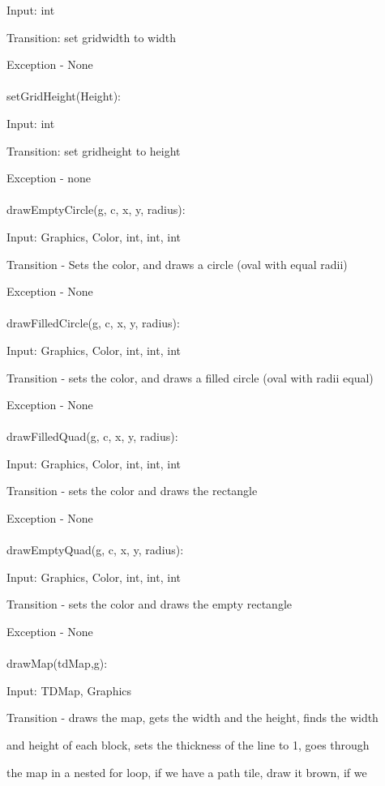 \documentclass[12,english]{article}
\begin{document}
		Input: int
		
		Transition: set gridwidth to width
		
		
		Exception - None\\
		\\
		setGridHeight(Height):
		
			Input: int
			
			Transition: set gridheight to height
			 
			Exception - none\\
			\\
		drawEmptyCircle(g, c, x, y, radius):
			
			Input: Graphics, Color, int, int, int
			 
			Transition - Sets the color, and draws a circle (oval with equal radii)
			  			 
			Exception - None\\ 
			 \\
		drawFilledCircle(g, c, x, y, radius):
		
		    Input: Graphics, Color, int, int, int
		     
		    Transition - sets the color, and draws a filled circle (oval with radii equal)
		     
		    Exception - None\\ 
			 \\
		drawFilledQuad(g, c, x, y, radius):
		
		    Input: Graphics, Color, int, int, int
		     
		    Transition - sets the color and draws the rectangle
		     
		    Exception - None\\ 
			 \\
        drawEmptyQuad(g, c, x, y, radius):
            
            Input: Graphics, Color, int, int, int
		    
		    Transition - sets the color and draws the empty rectangle
		    
		    Exception - None\\ 
			 \\
		drawMap(tdMap,g):
		    
		    Input: TDMap, Graphics
		    
		    Transition - draws the map, gets the width and the height, finds the width
		    
		    and height of each block, sets the thickness of the line to 1, goes through
		    
		    the map in a nested for loop, if we have a path tile, draw it brown, if we
		    
\end{document}
